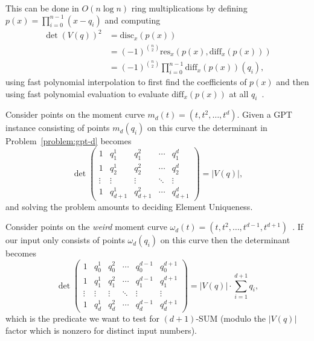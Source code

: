 This can be done in \(O(n \log n)\) ring multiplications
by defining
%
\(p(x) = \prod_{i=0}^{n-1} (x-q_i)\)
%
and computing
%
\begin{align*}
{\det(V(q))}^2 &= \mathrm{disc}_x(p(x)) \\
&= {(-1)}^{\binom{n}{2}} \mathrm{res}_x(p(x), \mathrm{diff}_x(p(x))) \\
&= {(-1)}^{\binom{n}{2}} \prod_{i=0}^{n-1} \mathrm{diff}_x(p(x))(q_i),
\end{align*}
%
using fast polynomial interpolation to first find the coefficients of
\(p(x)\) and then using fast polynomial evaluation to evaluate
\(\mathrm{diff}_x(p(x))\) at all \(q_i\)~\cite{St73,Ku73a,Ku73b,ASU75}.

Consider points on the moment curve $m_d(t) = (t, t^2, \ldots, t^d)$. Given a
GPT instance consisting of points $m_d(q_i)$ on this curve the determinant
in Problem~\ref{problem:gpt-d} becomes
%
\begin{displaymath}
\det\begin{pmatrix}
1      & q_1^1 & q_1^2 & \cdots & q_1^d \\
1      & q_2^1 & q_2^2 & \cdots & q_2^d \\
\vdots & \vdots  & \vdots  & \ddots & \vdots  \\
1      & q_{d+1}^1 & q_{d+1}^2 & \cdots & q_{d+1}^d
\end{pmatrix}
=
|V(q)|,
\end{displaymath}
and solving the problem amounts to deciding Element Uniqueness.

Consider points on the \emph{weird} moment curve $\omega_d(t) = (t, t^2, \ldots,
t^{d-1}, t^{d+1})$~\cite{Er99b}.
If our input only consists of points $\omega_d(q_i)$ on this curve then the
determinant becomes
%
\begin{displaymath}
\det\begin{pmatrix}
1      & q_0^1 & q_0^2 & \cdots & q_0^{d-1} & q_0^{d+1} \\
1      & q_1^1 & q_1^2 & \cdots & q_1^{d-1} & q_1^{d+1} \\
\vdots & \vdots  & \vdots  & \ddots & \vdots & \vdots  \\
1      & q_d^1 & q_d^2 & \cdots & q_d^{d-1} & q_d^{d+1}
\end{pmatrix} = |V(q)| \cdot \sum_{i=1}^{d+1} q_i,
\end{displaymath}
%
which is the predicate we want to test for $(d+1)$-SUM (modulo the $|V(q)|$
factor which is nonzero for distinct input numbers).

